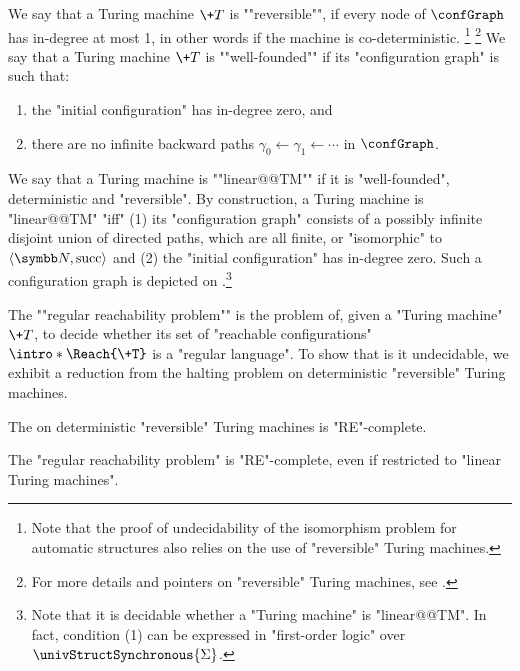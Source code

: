 \AP We say that a Turing machine $\+T$ is ""reversible"", if every node of $\confGraph$ has in-degree at most 1, in other words if the machine is co-deterministic.%
\footnote{
    Note that the proof of undecidability of the isomorphism problem for automatic structures 
    \cite[\S~5]{KhoussainovNiesRubinStephan2007Automatic} 
    also relies on the use of "reversible" Turing machines.
}%
\footnote{
    For more details and pointers on "reversible" Turing machines,
    see \cite[Chapter 5]{Morita2017Reversible}.
}
We say that a Turing machine $\+T$ is ""well-founded"" if its "configuration graph" is such that:
\begin{enumerate}
    \item the "initial configuration" has in-degree zero, and
    \item there are no infinite backward paths $\gamma_0 \leftarrow \gamma_1 \leftarrow \cdots$ in $\confGraph$. 
\end{enumerate}

We say that a Turing machine is ""linear@@TM"" if it is "well-founded", deterministic and "reversible".
By construction, a Turing machine is "linear@@TM" "iff" (1) its "configuration graph" consists of a possibly infinite disjoint union of directed paths, which are all finite, or "isomorphic" to $\tup{\N, \textrm{succ}}$ and (2) the "initial configuration" has in-degree zero.
Such a configuration graph is depicted on
.\footnote{Note
that it is decidable whether a "Turing machine" is "linear@@TM". In fact, condition (1) can be expressed in "first-order logic" over $\univStructSynchronous{\Sigma}$.}

\AP The ""regular reachability problem"" is the problem of, given a "Turing machine" $\+T$, to decide whether its set of "reachable configurations" \AP$\intro*\Reach{\+T}$ is a "regular language". To show that is it undecidable, we exhibit a reduction from the halting problem on deterministic "reversible" Turing machines.

\begin{proposition}
    \AP\label{prop:halting-problem-detrevTM}
    The  on deterministic "reversible" Turing machines is "RE"-complete.
\end{proposition}

\begin{lemma}
    \AP\label{lem:regular-reachability}
    The "regular reachability problem" is "RE"-complete, even if restricted
    to "linear Turing machines".
\end{lemma}

